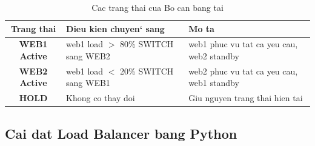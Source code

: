 \begin{table}[H]
\centering
\caption{Cac trang thai cua Bo can bang tai}
\vspace{0.3cm}
\begin{tabularx}{\textwidth}{|c|>{\raggedright\arraybackslash}X|>{\raggedright\arraybackslash}X|}
    \hline
    \textbf{Trang thai} & \textbf{Dieu kien chuyen` sang} & \textbf{Mo ta} \\ \hline
    \textbf{WEB1 Active} & web1 load $>$ 80\% \textrightarrow{} SWITCH sang WEB2 & web1 phuc vu tat ca yeu cau, web2 standby \\ \hline
    \textbf{WEB2 Active} & web1 load $<$ 20\% \textrightarrow{} SWITCH sang WEB1 & web2 phuc vu tat ca yeu cau, web1 standby \\ \hline
    \textbf{HOLD} & Khong co thay doi & Giu nguyen trang thai hien tai \\ \hline
\end{tabularx}
\label{tab:lb_states}
\end{table}

\subsection{Cai dat Load Balancer bang Python}

